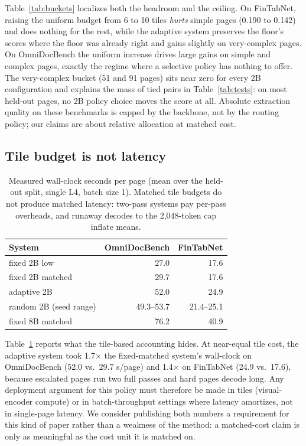 \documentclass[conference]{IEEEtran}
\begin{document}
Table~\ref{tab:buckets} localizes both the headroom and the ceiling. On
FinTabNet, raising the uniform budget from 6 to 10 tiles \emph{hurts}
simple pages (0.190 to 0.142) and does nothing for the rest, while the
adaptive system preserves the floor's scores where the floor was already
right and gains slightly on very-complex pages. On OmniDocBench the
uniform increase drives large gains on simple and complex pages,
exactly the regime where a selective policy has nothing to offer. The
very-complex bucket (51 and 91 pages) sits near zero for every 2B
configuration and explains the mass of tied pairs in
Table~\ref{tab:tests}: on most held-out pages, no 2B policy choice moves
the score at all. Absolute extraction quality on these benchmarks is
capped by the backbone, not by the routing policy; our claims are about
relative allocation at matched cost.

\subsection{Tile budget is not latency}
\label{sec:runtime}

\begin{table}[t]
  \centering
  \caption{Measured wall-clock seconds per page (mean over the held-out
  split, single L4, batch size 1). Matched tile budgets do not produce
  matched latency: two-pass systems pay per-pass overheads, and runaway
  decodes to the 2{,}048-token cap inflate means.}
  \label{tab:runtime}
  \small
  \begin{tabular}{lrr}
  \toprule
  System & OmniDocBench & FinTabNet \\
  \midrule
  fixed 2B low      & 27.0 & 17.6 \\
  fixed 2B matched  & 29.7 & 17.6 \\
  adaptive 2B       & 52.0 & 24.9 \\
  random 2B (seed range) & 49.3--53.7 & 21.4--25.1 \\
  fixed 8B matched  & 76.2 & 40.9 \\
  \bottomrule
  \end{tabular}
\end{table}

Table~\ref{tab:runtime} reports what the tile-based accounting hides. At
near-equal tile cost, the adaptive system took 1.7$\times$ the
fixed-matched system's wall-clock on OmniDocBench (52.0 vs.\ 29.7 s/page)
and 1.4$\times$ on FinTabNet (24.9 vs.\ 17.6), because escalated pages
run two full passes and hard pages decode long. Any deployment argument
for this policy must therefore be made in tiles (visual-encoder compute)
or in batch-throughput settings where latency amortizes, not in
single-page latency. We consider publishing both numbers a requirement
for this kind of paper rather than a weakness of the method: a
matched-cost claim is only as meaningful as the cost unit it is matched on.
\end{document}
